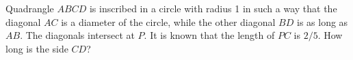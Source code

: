 Quadrangle $ ABCD$ is inscribed in a circle with radius 1 in such a way that the diagonal $ AC$ is a diameter of the circle, while the other diagonal $ BD$ is as long as $ AB$. The diagonals intersect at $ P$. It is known that the length of $ PC$ is $ 2/5$. How long is the side $ CD$?